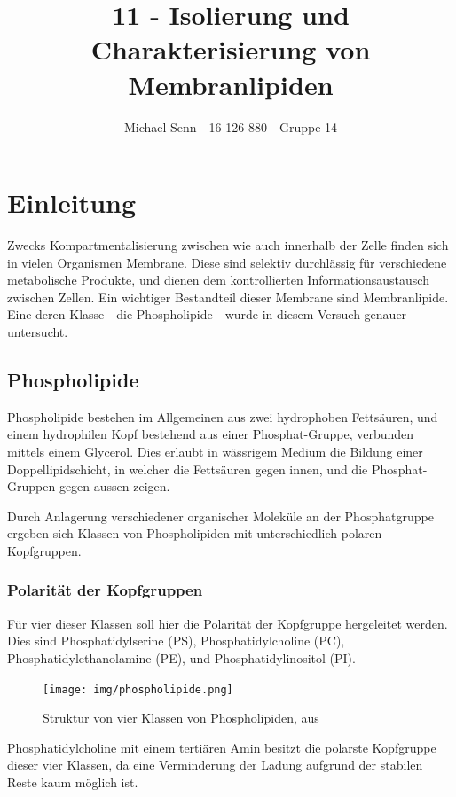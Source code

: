 \documentclass[a4paper,english]{scrreprt}
\title{11 - Isolierung und Charakterisierung von Membranlipiden}
\author{Michael Senn \maillink{michael.senn@students.unibe.ch} - 16-126-880 - Gruppe 14}
\date{\printdate}
\begin{document}
\maketitle

\chapter{Einleitung}

Zwecks Kompartmentalisierung zwischen wie auch innerhalb der Zelle finden sich
in vielen Organismen Membrane. Diese sind selektiv durchlässig für verschiedene
metabolische Produkte, und dienen dem kontrollierten Informationsaustausch
zwischen Zellen. Ein wichtiger Bestandteil dieser Membrane sind Membranlipide.
Eine deren Klasse - die Phospholipide - wurde in diesem Versuch genauer
untersucht.

\section{Phospholipide}

Phospholipide bestehen im Allgemeinen aus zwei hydrophoben Fettsäuren, und
einem hydrophilen Kopf bestehend aus einer Phosphat-Gruppe, verbunden mittels
einem Glycerol. Dies erlaubt in wässrigem Medium die Bildung einer
Doppellipidschicht, in welcher die Fettsäuren gegen innen, und die
Phosphat-Gruppen gegen aussen zeigen.

Durch Anlagerung verschiedener organischer Moleküle an der Phosphatgruppe
ergeben sich Klassen von Phospholipiden mit unterschiedlich polaren
Kopfgruppen.

\subsection{Polarität der Kopfgruppen}

Für vier dieser Klassen soll hier die Polarität der Kopfgruppe hergeleitet
werden. Dies sind Phosphatidylserine (PS), Phosphatidylcholine (PC),
Phosphatidylethanolamine (PE), und Phosphatidylinositol (PI).

\begin{figure}
	\centering
	\texttt{[image: img/phospholipide.png]}
	\caption{Struktur von vier Klassen von Phospholipiden, aus \cite{handoutv11}}
	\label{fig:phospholipide}
\end{figure}

Phosphatidylcholine mit einem tertiären Amin besitzt die polarste Kopfgruppe
dieser vier Klassen, da eine Verminderung der Ladung aufgrund der stabilen
 Reste kaum möglich ist.
\end{document}
